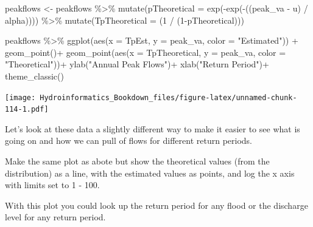 \documentclass[
]{book}
\newenvironment{Shaded}{\begin{snugshade}}{\end{snugshade}}
\newcommand{\AttributeTok}[1]{\textcolor[rgb]{0.77,0.63,0.00}{#1}}
\newcommand{\DecValTok}[1]{\textcolor[rgb]{0.00,0.00,0.81}{#1}}
\newcommand{\FunctionTok}[1]{\textcolor[rgb]{0.00,0.00,0.00}{#1}}
\newcommand{\NormalTok}[1]{#1}
\newcommand{\OtherTok}[1]{\textcolor[rgb]{0.56,0.35,0.01}{#1}}
\newcommand{\SpecialCharTok}[1]{\textcolor[rgb]{0.00,0.00,0.00}{#1}}
\newcommand{\StringTok}[1]{\textcolor[rgb]{0.31,0.60,0.02}{#1}}
\begin{document}
\begin{Shaded}
\begin{Highlighting}[]
\NormalTok{peakflows }\OtherTok{\textless{}{-}}\NormalTok{ peakflows }\SpecialCharTok{\%\textgreater{}\%} 
  \FunctionTok{mutate}\NormalTok{(}\AttributeTok{pTheoretical =} 
    \FunctionTok{exp}\NormalTok{(}\SpecialCharTok{{-}}\FunctionTok{exp}\NormalTok{(}\SpecialCharTok{{-}}\NormalTok{((peak\_va }\SpecialCharTok{{-}}\NormalTok{ u) }\SpecialCharTok{/}\NormalTok{ alpha)))) }\SpecialCharTok{\%\textgreater{}\%}
    \FunctionTok{mutate}\NormalTok{(}\AttributeTok{TpTheoretical =}\NormalTok{ (}\DecValTok{1} \SpecialCharTok{/}\NormalTok{ (}\DecValTok{1}\SpecialCharTok{{-}}\NormalTok{pTheoretical)))}


\NormalTok{peakflows }\SpecialCharTok{\%\textgreater{}\%} \FunctionTok{ggplot}\NormalTok{(}\FunctionTok{aes}\NormalTok{(}\AttributeTok{x =}\NormalTok{ TpEst, }\AttributeTok{y =}\NormalTok{ peak\_va, }\AttributeTok{color =} \StringTok{"Estimated"}\NormalTok{)) }\SpecialCharTok{+}
  \FunctionTok{geom\_point}\NormalTok{()}\SpecialCharTok{+}
  \FunctionTok{geom\_point}\NormalTok{(}\FunctionTok{aes}\NormalTok{(}\AttributeTok{x =}\NormalTok{ TpTheoretical, }\AttributeTok{y =}\NormalTok{ peak\_va, }\AttributeTok{color =} \StringTok{"Theoretical"}\NormalTok{))}\SpecialCharTok{+}
  \FunctionTok{ylab}\NormalTok{(}\StringTok{"Annual Peak Flows"}\NormalTok{)}\SpecialCharTok{+}
  \FunctionTok{xlab}\NormalTok{(}\StringTok{"Return Period"}\NormalTok{)}\SpecialCharTok{+}
  \FunctionTok{theme\_classic}\NormalTok{() }
\end{Highlighting}
\end{Shaded}

\texttt{[image: Hydroinformatics\_Bookdown\_files/figure-latex/unnamed-chunk-114-1.pdf]}

Let's look at these data a slightly different way to make it easier to see what is going on and how we can pull of flows for different return periods.

Make the same plot as abote but show the theoretical values (from the distribution) as a line, with the estimated values as points, and log the x axis with limits set to 1 - 100.

With this plot you could look up the return period for any flood or the discharge level for any return period.
\end{document}
